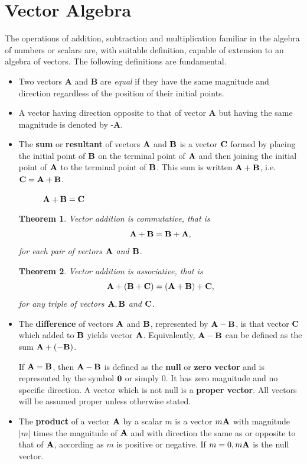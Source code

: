 \documentclass[titlepage,a4paper,12pt]{report}
\newtheorem{theorem}{Theorem}[section]
\begin{document}
\section{Vector Algebra}
The operations of addition, subtraction and multiplication familiar in the algebra
of numbers or scalars are, with suitable definition, capable of extension
to an algebra of vectors. The following definitions are fundamental.
\begin{itemize}
\item[(i)] Two vectors $\textbf{A}$ and $\textbf{B}$ are \textit{equal} if they have the same magnitude and direction regardless of the position of their initial points. 
\item[(ii)] A vector having direction opposite to that of vector $\textbf{A}$ but having the same magnitude is denoted by $\textbf{-A}$.
\item[(iii)] The \textbf{sum} or \textbf{resultant} of vectors $\bf{A}$ and $\bf{B}$ is a vector $\bf{C}$ formed by placing the initial point of $\bf{B}$ on the terminal point of $\bf{A}$ and then joining the initial point of $\bf{A}$ to the terminal point of $\bf{B}$. This sum is written $\bf{A}+\bf{B}$, i.e. $\bf{C} = \bf{A}+\bf{B}$. 
\begin{figure}[h!]

\caption{${\bf{A}}+{\bf{B}}={\bf{C}}$}
\end{figure}
\begin{theorem}
Vector addition is commutative, that is 
\[\bf{A}+\bf{B}=\bf{B}+\bf{A},\] for each pair of vectors $\bf{A}$ and $\bf{B}$.
\end{theorem}
\begin{theorem}
Vector addition is associative, that is 
\[\bf{A}+(\bf{B}+\bf{C})=(\bf{A}+\bf{B})+\bf{C},\] for any triple of vectors $\bf{A}, \bf{B}$ and $\bf{C}$.
\end{theorem}
\item[(iv)] The \textbf{difference} of vectors $\bf{A}$ and $\bf{B}$, represented by $\bf{A} -\bf{B}$, is that vector $\bf{C}$ which added to $\bf{B}$ yields vector $\bf{A}$. Equivalently, $\bf{A}- \bf{B}$ can be defined as the sum $\bf{A} + (-\bf{B})$.

\noindent If $\bf{A} = \bf{B}$, then $\bf{A}-\bf{B}$ is defined as the \textbf{null} or \textbf{zero vector} and is represented by the symbol $\bf{0}$ or simply $0$. It has zero magnitude and no specific direction. A vector which is not
null is a \textbf{proper vector}. All vectors will be assumed proper unless otherwise stated.
\item[(v)] The \textbf{product} of a vector $\bf{A}$ by a scalar $m$ is a vector $m\bf{A}$ with magnitude $|m|$ times the magnitude of $\bf{A}$ and with direction the same as or opposite to that of $\bf{A}$, according as $m$ is positive
or negative. If $m = 0, m\bf{A}$ is the null vector.
\end{itemize}
\end{document}
